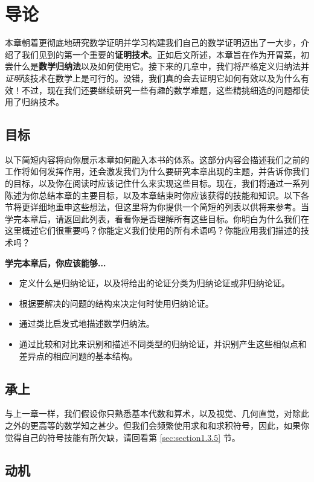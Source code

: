 \section{导论}

本章朝着更彻底地研究数学证明并学习构建我们自己的数学证明迈出了一大步，介绍了我们见到的第一个重要的\textbf{证明技术}。正如后文所述，本章旨在作为开胃菜，初尝什么是\textbf{数学归纳法}以及如何使用它。接下来的几章中，我们将严格定义归纳法并\emph{证明}该技术在数学上是可行的。没错，我们真的会去证明它如何有效以及为什么有效！不过，现在我们还要继续研究一些有趣的数学难题，这些精挑细选的问题都使用了归纳技术。

\subsection{目标}

以下简短内容将向你展示本章如何融入本书的体系。这部分内容会描述我们之前的工作将如何发挥作用，还会激发我们为什么要研究本章出现的主题，并告诉你我们的目标，以及你在阅读时应该记住什么来实现这些目标。现在，我们将通过一系列陈述为你总结本章的主要目标，以及本章结束时你应该获得的技能和知识。以下各节将更详细地重申这些想法，但这里将为你提供一个简短的列表以供将来参考。当学完本章后，请返回此列表，看看你是否理解所有这些目标。你明白为什么我们在这里概述它们很重要吗？你能定义我们使用的所有术语吗？你能应用我们描述的技术吗？

\textbf{学完本章后，你应该能够...}

\begin{itemize}
    \item 定义什么是归纳论证，以及将给出的论证分类为归纳论证或非归纳论证。
    \item 根据要解决的问题的结构来决定何时使用归纳论证。
    \item 通过类比启发式地描述数学归纳法。
    \item 通过比较和对比来识别和描述不同类型的归纳论证，并识别产生这些相似点和差异点的相应问题的基本结构。
\end{itemize}

\subsection{承上}

与上一章一样，我们假设你只熟悉基本代数和算术，以及视觉、几何直觉，对除此之外的更高等的数学知之甚少。但我们会频繁使用求和和求积符号，因此，如果你觉得自己的符号技能有所欠缺，请回看第 \ref{sec:section1.3.5} 节。

\subsection{动机}

